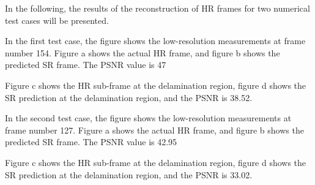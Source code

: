 \documentclass[10pt,aspectratio=169,dvipsnames]{beamer} %
\begin{document}
\note
{
	\footnotesize
	In the following, the results of the reconstruction of HR frames for two numerical test cases will be presented.				
	
	In the first test case, the figure shows the low-resolution measurements at frame number 154.		
	Figure a shows the actual HR frame, and figure b shows the predicted SR frame. 
	The PSNR value is 47
	
	Figure c shows the HR sub-frame at the delamination region, figure d shows the SR prediction at the delamination region, and the PSNR is 38.52.
	
	In the second test case, the figure shows the low-resolution measurements at frame number 127.
	Figure a shows the actual HR frame, and figure b shows the predicted SR frame. 
	The PSNR value is 42.95
	
	Figure c shows the HR sub-frame at the delamination region, figure d shows the SR prediction at the delamination region, and the PSNR is 33.02.
	
	
}
\setcounter{subfigure}{0}
\end{document}
